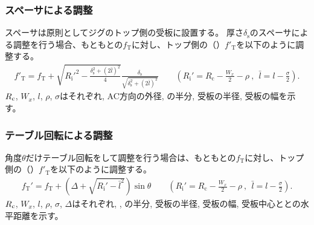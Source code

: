 \subsubsection{スペーサによる調整}
スペーサは原則としてジグのトップ側の受板に設置する。
厚さ$\delta_\mathrm s$のスペーサによる調整を行う場合、もともとの\TopAlocationLength$f_\mathrm T$に対し、トップ側の\nameAlocationLength（\TopReAlocationLength）$f'_\mathrm T$を以下のように調整する。
\begin{align*}
  f'_\mathrm T
  = f_\mathrm T
    +\sqrt{R_\mathrm i'^2-\frac{\delta_\mathrm s^2+(2\bar l)^2}4}\frac{\delta_\mathrm s}{\sqrt{\delta_\mathrm s^2+(2\bar l)^2}}\qquad
    \left(R_\mathrm i' = R_\mathrm c-\frac{W_x}2-\rho~,~~\bar l = l-\frac\sigma2\right).
\end{align*}
$R_\textrm c$, $W_x$, $l$, $\rho$, $\sigma$はそれぞれ\CenterCurvatureRadius, AC方向の外径, \JigWidth の半分, 受板の半径, 受板の幅を示す。

\subsubsection{テーブル回転による調整}
角度$\theta$だけテーブル回転をして調整を行う場合は、もともとの\TopAlocationLength$f_\mathrm T$に対し、トップ側の\nameAlocationLength（\TopReAlocationLength）$f'_\mathrm T$を以下のように調整する。
\begin{align*}
  f_\mathrm T'
  = f_\mathrm T+\left(\Delta+\sqrt{R_\mathrm i'-\bar l^2}\right)\sin\theta\qquad
    \left(R_\mathrm i' = R_\mathrm c-\frac{W_x}2-\rho~,~~\bar l = l-\frac\sigma2\right).
\end{align*}
$R_\textrm c$, $W_x$, $l$, $\rho$, $\sigma$, $\Delta$はそれぞれ\CenterCurvatureRadius, \ACOD, \JigWidth の半分, 受板の半径, 受板の幅, 受板中心と\TableCenter との水平距離を示す。



